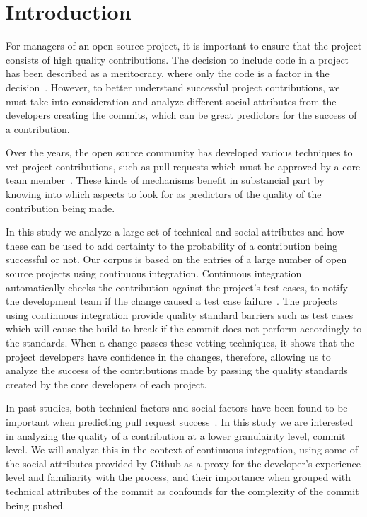\documentclass[10pt, conference]{IEEEtran}
\begin{document}
\section{Introduction}
For managers of an open source project, it is important to ensure that the
project consists of high quality contributions.  The decision to include code in
a project has been described as a meritocracy, where only the code is a factor
in the decision~\cite{Scacchi07}.  However, to better understand successful 
project contributions, we must take into consideration and analyze 
different social attributes from the developers creating the commits,
which can be great predictors for the success of a contribution.

Over the years, the open source
community has developed various techniques to vet project contributions, such as pull
requests which must be approved by a core team member~\cite{gousios14}. 
These kinds of mechanisms benefit in substancial part by knowing into which 
aspects to look for as predictors of the quality of the contribution being made. 

In this study we analyze a large set of technical and social attributes 
and how these can be used to
add certainty to the probability of a contribution being successful or not. 
Our corpus is based on the entries of a large number of open source projects
using continuous integration. Continuous integration automatically checks
the contribution against the project's test cases, to notify the development
team if the change caused a test case failure~\cite{Meyer14}. The
projects using continuous integration provide quality standard barriers such as
test cases which will cause the build to break if the commit does not perform
accordingly to the standards. When a change
passes these vetting techniques, it shows that the project developers
have confidence in the changes, therefore, allowing us to analyze the success
of the contributions made by passing the quality standards created by the 
core developers of each project.

In past studies, both technical factors and social factors have been found to be
important when predicting pull request success~\cite{tsay14icse,tsay14fse}.
In this study we are interested in analyzing the quality of a contribution 
at a lower granulairity level, commit level. We will analyze this in the 
context of continuous integration, using some of the social attributes provided
by Github as a proxy for the developer's experience level and familiarity with
the process, and their importance when grouped with technical attributes of the commit as 
confounds for the complexity of the commit being pushed. 
\end{document}
